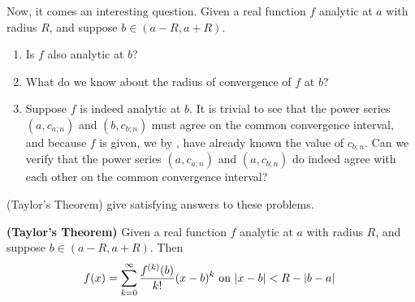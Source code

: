 \documentclass{report}
\begin{document}
\begin{mdframed}
Now, it comes an interesting question. Given a real function $f$ analytic at $a$ with radius  $R$, and suppose $b \in (a-R,a+R)$.
\begin{enumerate}[label=(\alph*)]
  \item Is $f$ also analytic at $b$?
   \item What do we know about the radius of convergence of $f$ at $b$?
   \item Suppose $f$ is indeed analytic at $b$. It is trivial to see that the power series $(a,c_{a;n})$ and $(b,c_{b;n})$ must agree on the common convergence interval, and because $f$ is given, we by , have already known the value of $c_{b;n}$. Can we verify that the power series  $(a,c_{a;n})$ and $(a,c_{b;n})$ do indeed agree with each other on the common convergence interval?
\end{enumerate}
 (Taylor's Theorem) give satisfying answers to these problems. 
\end{mdframed}
\begin{theorem}
\label{TT}
  \textbf{(Taylor's Theorem)} Given a real function $f$ analytic at $a$ with radius $R$, and suppose $b\in (a-R,a+R)$. Then 
\begin{align*}
f(x)=\sum_{k=0}^\infty \frac{f^{(k)}(b)}{k!}(x-b)^k\text{ on $\left|x-b\right|<R-\left|b-a\right|$ }
\end{align*}
\end{theorem}
\end{document}
